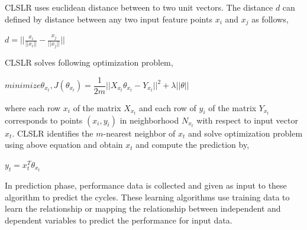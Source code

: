 \par CLSLR uses euclidean distance between to two unit vectors. The distance $d$ can defined by distance between any two input feature points $x_{i}$ and $x_{j}$ as follows, 

$ d = || \frac{x_{i}}{||x_{i}||} - \frac{x_{j}}{||x_{j}||} ||$

CLSLR solves following optimization problem, 

$minimize \theta_{x_{t}},  J(\theta_{x_{t}})=\dfrac{1}{2m} || X_{x_{t}}\theta_{x_{t}} - Y_{x_{t}}||^{2} + \lambda||\theta||$

where each row $x_{i}$ of the matrix $X_{x_{t}}$ and each row of $y_{i}$ of the matrix $Y_{x_{t}}$ corresponds to points $(x_{i},y_{i})$ in neighborhood $N_{x_{t}}$ with respect to input vector $x_{t}$. CLSLR identifies the $m$-nearest neighbor of $x_{t}$ and solve optimization problem using above equation and obtain $x_{t}$ and compute the prediction by, 

$y_{t} = x_{t}^{T}\theta_{x_{t}}$

\par In prediction phase, performance data is collected and given as input to these algorithm to predict the cycles. These learning algorithms use training data to learn the relationship or mapping the relationship between independent and dependent variables to predict the performance for input data. 





